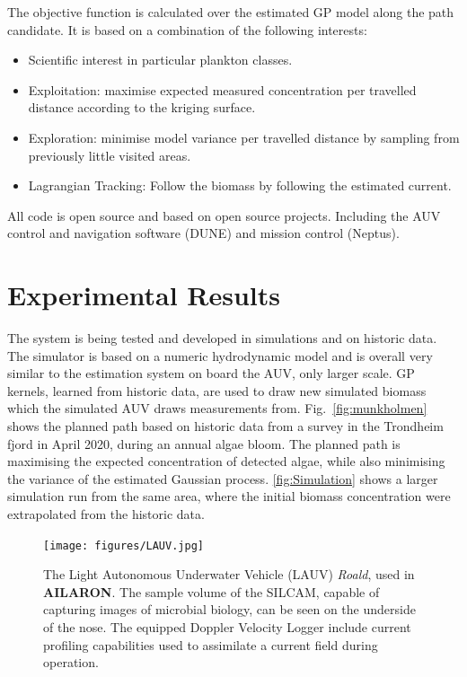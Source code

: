 \documentclass[conference]{IEEEtran}
\def\proje{{\textbf{AILARON}}}
\newcommand{\cmt}[1]{{\color{red}{#1}}}
\begin{document}
The objective function is calculated over the estimated GP model along
the path candidate. It is based on a combination of the following interests:
\begin{itemize}
    \item Scientific interest in particular plankton classes. 
    \item Exploitation: maximise expected measured concentration per travelled distance
      according to the kriging surface. 
    \item Exploration: minimise model variance per travelled distance by sampling from
      previously little visited areas.
    \item Lagrangian Tracking: Follow the biomass by following the estimated current.
\end{itemize}
All code is open source and based on open source projects. Including
the AUV control and navigation software (DUNE) and mission control
(Neptus)\cite{pinto2013lsts}.

\section{Experimental Results}

The system is being tested and developed in simulations and on historic
data.
The simulator is based on a numeric hydrodynamic model and is overall
very similar to the estimation system on board the AUV, only larger scale.
GP kernels, learned from historic data, are used to draw new simulated biomass which the simulated AUV draws measurements from. 
Fig.~\ref{fig:munkholmen} shows the planned path based on historic
data from a survey in the Trondheim fjord in April 2020, during an
annual algae bloom. The planned path is maximising the expected
concentration of detected algae, while also minimising the variance of
the estimated Gaussian process.
\cref{fig:Simulation} shows a larger simulation run from the same area, where the initial biomass concentration were extrapolated from the historic data.

\begin{figure}[tbp]
  \centering
  \texttt{[image: figures/LAUV.jpg]}
  \caption{The Light Autonomous Underwater Vehicle (LAUV)
    \emph{Roald}, used in \proje. The sample volume of the SILCAM,
    capable of capturing images of microbial biology, can be seen on
    the underside of the nose. The equipped Doppler Velocity Logger
    include current profiling capabilities used to assimilate a
    current field during operation.}
  \label{fig:roald}
\end{figure}
\end{document}

